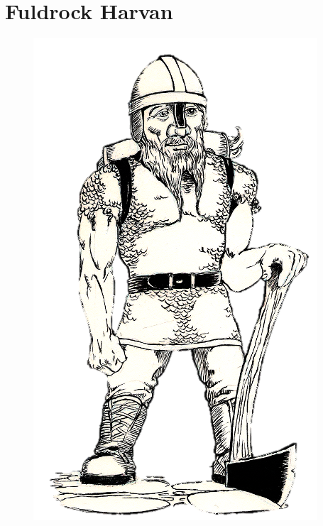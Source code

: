 \documentclass[letterpaper,10pt,twoside,twocolumn,openany]{book}
\begin{document}
	\chapter{Fuldrock Harvan}
	\begin{figure}
		\includegraphics[width=\linewidth]{../fuldrock.png}
		\label{fig:az}
	\end{figure}
	
\end{document}
